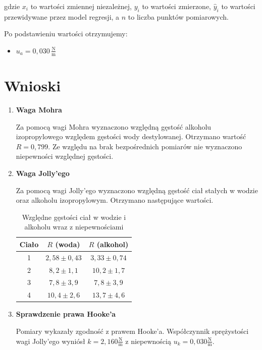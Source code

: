 \documentclass[a4paper,12pt]{article}
\begin{document}
gdzie $x_i$ to wartości zmiennej niezależnej, $y_i$ to wartości zmierzone, $\hat{y}_i$ to wartości przewidywane przez model regresji, a $n$ to liczba punktów pomiarowych.

Po podstawieniu wartości otrzymujemy:

\begin{itemize}
    \item $u_a = 0{,}030\,\frac{\text{N}}{\text{m}}$
\end{itemize}

\section{Wnioski}

\begin{enumerate}
    \item{\textbf{Waga Mohra}}

          Za pomocą wagi Mohra wyznaczono względną gęstość alkoholu izopropylowego względem gęstości wody destylowanej. Otrzymano wartość $R = 0{,}799$. Ze względu na brak bezpośrednich pomiarów nie wyznaczono niepewności względnej gęstości.

    \item{\textbf{Waga Jolly'ego}}

          Za pomocą wagi Jolly'ego wyznaczono względną gęstość ciał stałych w wodzie oraz alkoholu izopropylowym. Otrzymano następujące wartości.

          \begin{table}[H]
              \centering
              \begin{tabular}{|c|c|c|}
                  \hline
                  \textbf{Ciało} & $R$ (woda) & $R$ (alkohol) \\
                  \hline
                  1 & $2{,}58 \pm 0{,}43$ & $3{,}33 \pm 0{,}74$ \\
                  \hline
                  2 & $8{,}2 \pm 1{,}1$ & $10{,}2 \pm 1{,}7$ \\
                  \hline
                  3 & $7{,}8 \pm 3{,}9$ & $7{,}8 \pm 3{,}9$ \\
                  \hline
                  4 & $10{,}4 \pm 2{,}6$ & $13{,}7 \pm 4{,}6$ \\
                  \hline
              \end{tabular}
              \caption{Względne gęstości ciał w wodzie i alkoholu wraz z niepewnościami}
              \label{tab:wzgledna_gestosc_jolly_wyniki}
          \end{table}

    \item{\textbf{Sprawdzenie prawa Hooke'a}}

          Pomiary wykazały zgodność z prawem Hooke'a. Współczynnik sprężystości wagi Jolly'ego wyniósł $k = 2{,}160 \frac{\text{N}}{\text{m}}$ z niepewnością $u_k = 0{,}030 \frac{\text{N}}{\text{m}}$.

\end{enumerate}
\end{document}
